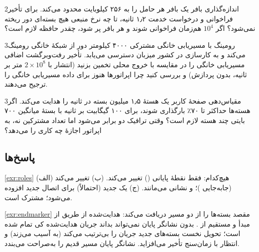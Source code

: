 \documentclass[11pt,a4paper]{article}
\begin{document}
\begin{exercisebox}{2}{اندازه‌گذاری بافر}\label{exr:buffer}
یک  بافر هر حامل را به ۲۵۶ کیلوبایت محدود می‌کند. برای تأخیر فراخوانی و درخواست خدمت ۱٫۲ ثانیه، تا چه نرخ منبعی
هیچ بسته‌ای دور ریخته نمی‌شود؟ اگر $10^4$  هم‌زمان فراخوانی شوند و هر بافر پر شود، چقدر حافظه لازم است؟
\end{exercisebox}

\begin{exercisebox}{3}{رومینگ با مسیریابی خانگی}\label{exr:roaming}
مشترکی ۴۰۰۰ کیلومتر دور از شبکهٔ خانگی رومینگ می‌کند و به کارسازی در کشور میزبان دسترسی می‌یابد. تأخیر رفت‌وبرگشت
اضافی مسیریابی خانگی را در مقایسه با خروج محلی تخمین بزنید (انتشار با $2\times10^8$ متر بر ثانیه، بدون پردازش) و بررسی
کنید چرا اپراتورها هنوز برای داده مسیریابی خانگی را ترجیح می‌دهند.
\end{exercisebox}

\begin{exercisebox}{3}{مقیاس‌دهی صفحهٔ کاربر}\label{exr:cups}
یک هستهٔ  ۱٫۵ میلیون بسته در ثانیه را هدایت می‌کند. اگر هسته‌ها حداکثر تا ۷۰٪ بارگذاری شوند، برای ۱۰۰ گیگابیت
بر ثانیه با بستهٔ میانگین ۷۰۰ بایتی چند هسته لازم است؟ وقتی ترافیک دو برابر می‌شود اما تعداد مشترکین نه،  به
اپراتور اجازهٔ چه کاری را می‌دهد؟
\end{exercisebox}

\subsection*{پاسخ‌ها}

\begin{solutionbox}{\ref{exr:roles}}
(الف) هیچ‌کدام: فقط نقطهٔ پایانی  () تغییر می‌کند. (ب)  تغییر می‌کند (جابه‌جایی )؛
 و نشانی  می‌مانند. (ج) یک  جدید (احتمالاً) برای اتصال  جدید افزوده می‌شود؛ 
مشترک است.
\end{solutionbox}

\begin{solutionbox}{\ref{exr:endmarker}}
مقصد بسته‌ها را از دو مسیر دریافت می‌کند: هدایت‌شده از طریق  از مبدأ و مستقیم از . بدون نشانگر پایان
نمی‌تواند بداند جریان هدایت‌شده کی تمام شده است؛ تحویل نخست بسته‌های جدید جریان را بی‌ترتیب می‌کند (به  آسیب
می‌زند) و انتظار با زمان‌سنج تأخیر می‌افزاید. نشانگر پایان مسیر قدیم را به‌صراحت می‌بندد.
\end{solutionbox}
\end{document}
